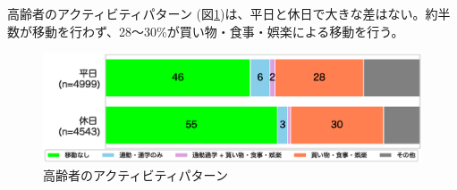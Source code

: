 \documentclass[a4paper,12pt, uplatex]{jsbook}
\begin{document}
高齢者のアクティビティパターン (図\ref{fig:activity_pattern_elder})は、平日と休日で大きな差はない。約半数が移動を行わず、28〜30\%が買い物・食事・娯楽による移動を行う。
%
\begin{figure}[htbp]
    \centering
    \includegraphics[width=1.0\textwidth]{picture/activity_pattern_高齢者.eps}
    \caption{高齢者のアクティビティパターン}
    \label{fig:activity_pattern_elder}
\end{figure}
\end{document}
